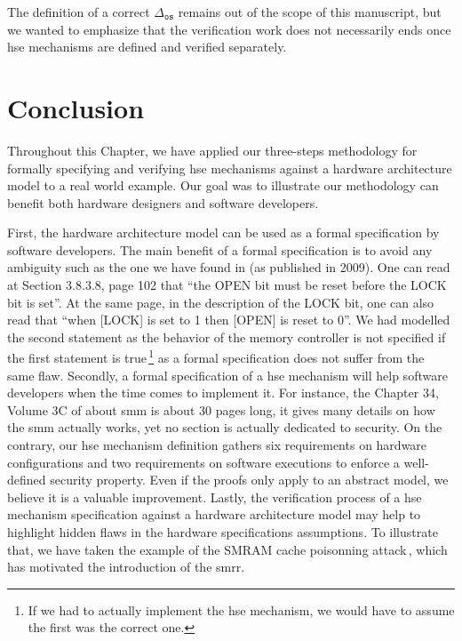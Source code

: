 The definition of a correct \( \Delta_{\mathtt{os}} \) remains out of the scope
of this manuscript, but we wanted to emphasize that the verification work does
not necessarily ends once \ac{hse} mechanisms are defined and verified
separately.


\section{Conclusion}
\label{sec:speccert:discuss}

Throughout this Chapter, we have applied our three-steps methodology for
formally specifying and verifying \ac{hse} mechanisms against a hardware
architecture model to a real world example.
%
Our goal was to illustrate our methodology can benefit both hardware designers
and software developers.

First, the hardware architecture model can be used as a formal specification by
software developers.
%
The main benefit of a formal specification is to avoid any ambiguity such as the
one we have found in \cite{intel2009mch} (as published in 2009).
%
One can read at Section 3.8.3.8, page 102 that ``the OPEN bit must be reset
before the LOCK bit is set''.
%
At the same page, in the description of the LOCK bit, one can also read that
``when [LOCK] is set to 1 then [OPEN] is reset to 0''.
%
We had modelled the second statement as the behavior of the memory controller is
not specified if the first statement is true\,\footnote{If we had to actually
  implement the \ac{hse} mechanism, we would have to assume the first was the
  correct one.}   as a formal specification does not suffer
from the same flaw.
%
Secondly, a formal specification of a \ac{hse} mechanism will help software
developers when the time comes to implement it.
%
For instance, the Chapter 34, Volume 3C of \cite{intel2014manual} about \ac{smm}
is about 30 pages long, it gives many details on how the \ac{smm} actually
works, yet no section is actually dedicated to security.
%
On the contrary, our \ac{hse} mechanism definition gathers six requirements on
hardware configurations and two requirements on software executions to enforce a
well-defined security property.
%
Even if the proofs only apply to an abstract model, we believe it is a valuable
improvement.
%
Lastly, the verification process of a \ac{hse} mechanism specification against a
hardware architecture model may help to highlight hidden flaws in the hardware
specifications assumptions.
%
To illustrate that, we have taken the example of the SMRAM cache poisonning
attack\,\cite{wojtczuk2009smram,duflot2009smram}, which has motivated the
introduction of the \ac{smrr}.

